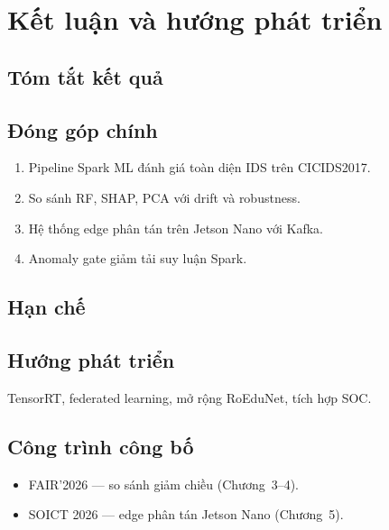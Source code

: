 \chapter{Kết luận và hướng phát triển}

\section{Tóm tắt kết quả}


\section{Đóng góp chính}

\begin{enumerate}
  \item Pipeline Spark ML đánh giá toàn diện IDS trên CICIDS2017.
  \item So sánh RF, SHAP, PCA với drift và robustness.
  \item Hệ thống edge phân tán trên Jetson Nano với Kafka.
  \item Anomaly gate giảm tải suy luận Spark.
\end{enumerate}

\section{Hạn chế}


\section{Hướng phát triển}

TensorRT, federated learning, mở rộng RoEduNet, tích hợp SOC.

\section{Công trình công bố}

\begin{itemize}
  \item FAIR'2026 --- so sánh giảm chiều (Chương~3--4).
  \item SOICT 2026 --- edge phân tán Jetson Nano (Chương~5).
\end{itemize}

